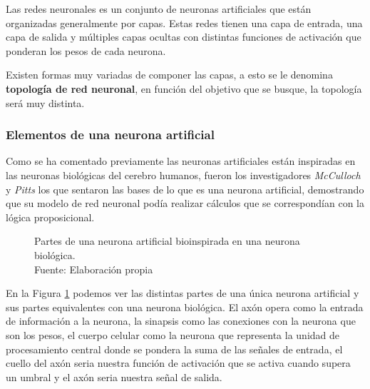 Las redes neuronales es un conjunto de neuronas artificiales que están organizadas generalmente por capas. Estas redes tienen una capa de entrada, una capa de salida y múltiples capas ocultas con distintas funciones de activación que ponderan los pesos de cada neurona.

Existen formas muy variadas de componer las capas, a esto se le denomina \textbf{topología de red neuronal}, en función del objetivo que se busque, la topología será muy distinta.

\subsubsection{Elementos de una neurona artificial}

Como se ha comentado previamente las neuronas artificiales están inspiradas en las neuronas biológicas del cerebro humanos, fueron los investigadores \textit{McCulloch} y \textit{Pitts} \cite{mcculloch1943logical} los que sentaron las bases de lo que es una neurona artificial, demostrando que su modelo de red neuronal podía realizar cálculos que se correspondían con la lógica proposicional.


\begin{figure}[H]
    \centering
    \centerline{}
    \caption{Partes de una neurona artificial bioinspirada en una neurona biológica.\\Fuente: Elaboración propia}
    \label{fig:artificial-neuron}
\end{figure}

En la Figura \ref{fig:artificial-neuron} podemos ver las distintas partes de una única neurona artificial y sus partes equivalentes con una neurona biológica. El axón opera como la entrada de información a la neurona, la sinapsis como las conexiones con la neurona que son los pesos, el cuerpo celular como la neurona que representa la unidad de procesamiento central donde se pondera la suma de las señales de entrada, el cuello del axón seria nuestra función de activación que se activa cuando supera un umbral y el axón seria nuestra señal de salida.



